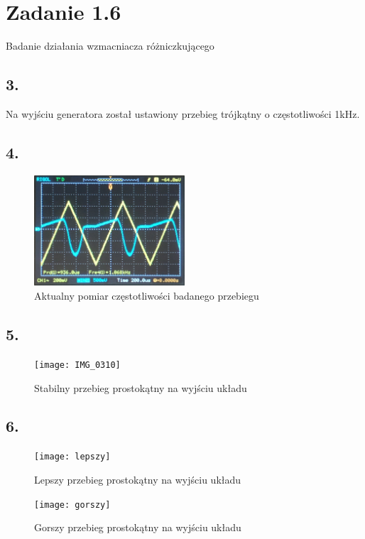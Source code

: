 \documentclass[polish,a4paper]{article}
\begin{document}
\section{Zadanie 1.6}
Badanie działania wzmacniacza różniczkującego
\subsection*{3.}
Na wyjściu generatora został ustawiony przebieg trójkątny o częstotliwości 1kHz.
\subsection*{4.}
\begin{figure}[!h]
\centering
\includegraphics[width=0.5\textwidth]{czestotliwosc3}
\caption{Aktualny pomiar częstotliwości badanego przebiegu}
\end{figure}
\subsection*{5.}
\begin{figure}[!h]
\centering
\texttt{[image: IMG\_0310]}
\caption{Stabilny przebieg prostokątny na wyjściu układu}
\end{figure}
\subsection*{6.}
\begin{figure}[!h]
\centering
\texttt{[image: lepszy]}
\caption{Lepszy przebieg prostokątny na wyjściu układu}
\end{figure}
\begin{figure}[!h]
\centering
\texttt{[image: gorszy]}
\caption{Gorszy przebieg prostokątny na wyjściu układu}
\end{figure}
\end{document}
